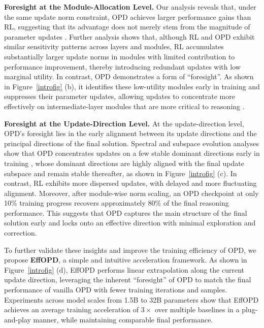 \documentclass{llmxive}
\begin{document}
\textbf{Foresight at the Module-Allocation Level.} 
Our analysis reveals that, under the same update norm constraint, OPD achieves larger performance gains than RL, suggesting that its advantage does not merely stem from the magnitude of parameter updates \citep{geva2021transformerfeedforwardlayerskeyvalue,geva2023dissectingrecallfactualassociations}. Further analysis shows that, although RL and OPD exhibit similar sensitivity patterns across layers and modules, RL accumulates substantially larger update norms in modules with limited contribution to performance improvement, thereby introducing redundant updates with low marginal utility. In contrast, OPD demonstrates a form of ``foresight''. As shown in Figure~\ref{introfig} (b), it identifies these low-utility modules early in training and suppresses their parameter updates, allowing updates to concentrate more effectively on intermediate-layer modules that are more critical to reasoning \citep{meng2023locatingeditingfactualassociations}.


\textbf{Foresight at the Update-Direction Level.}
At the update-direction level, OPD's foresight lies in the early alignment between its update directions and the principal directions of the final solution. Spectral and subspace evolution analyses show that OPD concentrates updates on a few stable dominant directions early in training \citep{zhang2015singularvaluedecompositionapplications}, whose dominant directions are highly aligned with the final update subspace and remain stable thereafter, as shown in Figure~\ref{introfig} (c). In contrast, RL exhibits more dispersed updates, with delayed and more fluctuating alignment. Moreover, after module-wise norm scaling, an OPD checkpoint at only 10\% training progress recovers approximately 80\% of the final reasoning performance. This suggests that OPD captures the main structure of the final solution early and locks onto an effective direction with minimal exploration and correction.

To further validate these insights and improve the training efficiency of OPD, we propose \textbf{EffOPD}, a simple and intuitive acceleration framework. As shown in Figure~\ref{introfig} (d), EffOPD performs linear extrapolation along the current update direction, leveraging the inherent ``foresight'' of OPD to match the final performance of vanilla OPD with fewer training iterations and samples. Experiments across model scales from 1.5B to 32B parameters show that EffOPD achieves an average training acceleration of $3\times$ over multiple baselines in a plug-and-play manner, while maintaining comparable final performance.
\end{document}
